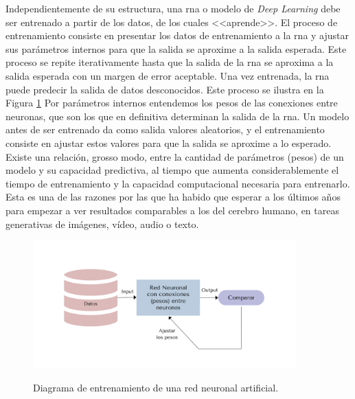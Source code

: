 Independientemente de su estructura, una \gls{rna} o modelo de \textit{Deep Learning} debe ser entrenado a partir de los datos, de los cuales <<aprende>>. El proceso de entrenamiento consiste en presentar los datos de entrenamiento a la \gls{rna} y ajustar sus parámetros internos para que la salida se aproxime a la salida esperada. Este proceso se repite iterativamente hasta que la salida de la \gls{rna} se aproxima a la salida esperada con un margen de error aceptable. Una vez entrenada, la \gls{rna} puede predecir la salida de datos desconocidos. Este proceso se ilustra en la Figura \ref{fig:ann_training} Por parámetros internos entendemos los pesos de las conexiones entre neuronas, que son los que en definitiva determinan la salida de la \gls{rna}. Un modelo antes de ser entrenado da como salida valores aleatorios, y el entrenamiento consiste en ajustar estos valores para que la salida se aproxime a lo esperado. Existe una relación, grosso modo, entre la cantidad de parámetros (pesos) de un modelo y su capacidad predictiva, al tiempo que aumenta considerablemente el tiempo de entrenamiento y la capacidad computacional necesaria para entrenarlo. Esta es una de las razones por las que ha habido que esperar a los últimos años para empezar a ver resultados comparables a los del cerebro humano, en tareas generativas de imágenes, vídeo, audio o texto.

\begin{figure}[H]
    \caption[Diagrama de entrenamiento de una red neuronal artificial]{Diagrama de entrenamiento de una red neuronal artificial.}
    \centering
    \includegraphics[width=0.9\textwidth]{./figuras/ann_training.png}
    \source{\propio}
    \label{fig:ann_training}
\end{figure}

